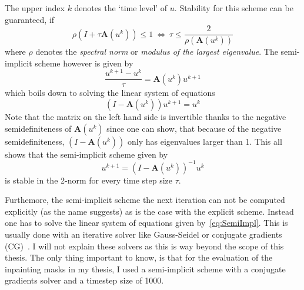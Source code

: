 The upper index $k$ denotes the `time level' of $u$.
Stability for this scheme can be guaranteed, if 
\begin{equation}
    \rho(I + \tau\mathbf{A}(u^k)) \leq 1\ \Leftrightarrow\ \tau \leq \frac{2}{\rho(\mathbf{A}(u^k))}
\end{equation}
where $\rho$ denotes the \textit{spectral norm} or \textit{modulus of the largest
eigenvalue}.\cite{www13}
The semi-implicit scheme however is given by
\begin{equation}
    \frac{u^{k+1} - u^{k}}{\tau} = \mathbf{A}(u^k)u^{k+1}
\end{equation}
which boils down to solving the linear system of equations
\begin{equation}
    (I-\mathbf{A}(u^k))u^{k+1} = u^k\label{eq:SemiImpl}
\end{equation}
Note that the matrix on the left hand side is invertible thanks to the negative semidefiniteness of
$\mathbf{A}(u^k)$ since one can show, that because of the negative semidefiniteness, $(I-\mathbf{A}(u^k))$ only has eigenvalues
larger than 1.
This all shows that the semi-implicit scheme given by 
\begin{equation}
    u^{k+1} = {(I- \mathbf{A}(u^k))}^{-1}u^k
\end{equation}
is stable in the 2-norm for every time step size $\tau$.

Furthemore, the semi-implicit scheme the next iteration can not be computed explicitly (as the name
suggests) as is the case with the explicit scheme. Instead one has to solve
the linear system of equations given by~\eqref{eq:SemiImpl}. This is usually done with an iterative
solver like Gauss-Seidel or conjugate gradients (CG)~\cite{conjugateGradients}. I will not explain these solvers as this is way
beyond the scope of this thesis.
The only thing important to know, is that for the evaluation of the inpainting masks in my thesis,
I used a semi-implicit scheme with a conjugate gradients solver and a timestep size of 1000.

